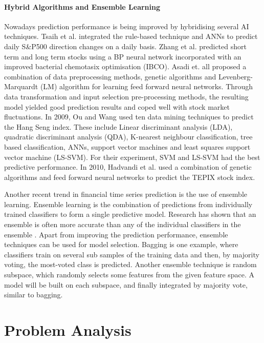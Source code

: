 \documentclass{UoYCSproject}
\begin{document}
\subsubsection{Hybrid Algorithms and Ensemble Learning}
Nowadays prediction performance is being improved by hybridising several AI techniques. Tsaih et al. \cite{tsaih1998forecasting} integrated the rule-based technique and ANNs to predict daily S\&P500 direction changes on a daily basis. Zhang et al. \cite{zhang2009stock} predicted short term and long term stocks using a BP neural network incorporated with an improved bacterial chemotasix optimisation (IBCO). Asadi et. all \cite{asadi2012hybridization} proposed a combination of data preprocessing methods, genetic algorithms and Levenberg-Marquardt (LM) algorithm for learning feed forward neural networks. Through data transformation and input selection pre-processing methods, the resulting model yielded good prediction results and coped well with stock market fluctuations. In 2009, Ou and Wang \cite{ou2009prediction} used ten data mining techniques to predict the Hang Seng index. These include Linear discriminant analysis (LDA), quadratic discriminant analysis (QDA), K-nearest neighbour classification, tree based classification, ANNs, support vector machines and least squares support vector machine (LS-SVM). For their experiment, SVM and LS-SVM had the best predictive performance. In 2010, Hadvandi et al. \cite{hadavandi2010developing} used a combination of genetic algorithms and feed forward neural networks to predict the TEPIX stock index.

Another recent trend in financial time series prediction is the use of ensemble learning. Ensemble learning is the combination of predictions from individually trained classifiers to form a single predictive model. Research has shown that an ensemble is often more accurate than any of the individual classifiers in the ensemble \cite{opitz1999popular}. Apart from improving the prediction performance, ensemble techniques can be used for model selection. Bagging \cite{breiman1996bagging} is one example, where classifiers train on several sub samples of the training data and then, by majority voting, the most-voted class is predicted. Another ensemble technique is random subspace, which randomly selects some features from the given feature space. A model will be built on each subspace, and finally integrated by majority vote, similar to bagging. 

\chapter{Problem Analysis}
\end{document}
